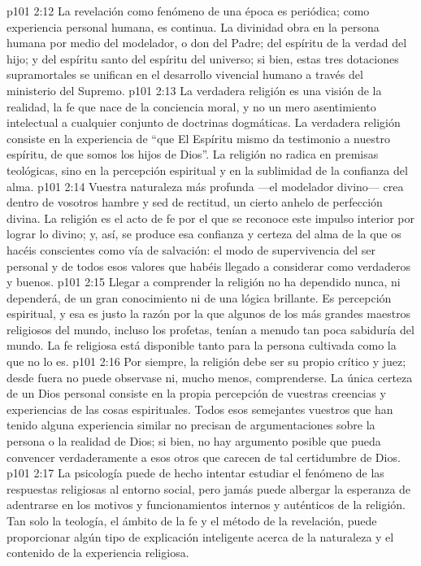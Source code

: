\vs p101 2:12 \pc La revelación como fenómeno de una época es periódica; como experiencia personal humana, es continua. La divinidad obra en la persona humana por medio del modelador, o don del Padre; del espíritu de la verdad del hijo; y del espíritu santo del espíritu del universo; si bien, estas tres dotaciones supramortales se unifican en el desarrollo vivencial humano a través del ministerio del Supremo.
\vs p101 2:13 La verdadera religión es una visión de la realidad, la fe que nace de la conciencia moral, y no un mero asentimiento intelectual a cualquier conjunto de doctrinas dogmáticas. La verdadera religión consiste en la experiencia de “que El Espíritu mismo da testimonio a nuestro espíritu, de que somos los hijos de Dios”. La religión no radica en premisas teológicas, sino en la percepción espiritual y en la sublimidad de la confianza del alma.
\vs p101 2:14 Vuestra naturaleza más profunda ---el modelador divino--- crea dentro de vosotros hambre y sed de rectitud, un cierto anhelo de perfección divina. La religión es el acto de fe por el que se reconoce este impulso interior por lograr lo divino; y, así, se produce esa confianza y certeza del alma de la que os hacéis conscientes como vía de salvación: el modo de supervivencia del ser personal y de todos esos valores que habéis llegado a considerar como verdaderos y buenos.
\vs p101 2:15 \pc Llegar a comprender la religión no ha dependido nunca, ni dependerá, de un gran conocimiento ni de una lógica brillante. Es percepción espiritual, y esa es justo la razón por la que algunos de los más grandes maestros religiosos del mundo, incluso los profetas, tenían a menudo tan poca sabiduría del mundo. La fe religiosa está disponible tanto para la persona cultivada como la que no lo es.
\vs p101 2:16 Por siempre, la religión debe ser su propio crítico y juez; desde fuera no puede observase ni, mucho menos, comprenderse. La única certeza de un Dios personal consiste en la propia percepción de vuestras creencias y experiencias de las cosas espirituales. Todos esos semejantes vuestros que han tenido alguna experiencia similar no precisan de argumentaciones sobre la persona o la realidad de Dios; si bien, no hay argumento posible que pueda convencer verdaderamente a esos otros que carecen de tal certidumbre de Dios.
\vs p101 2:17 La psicología puede de hecho intentar estudiar el fenómeno de las respuestas religiosas al entorno social, pero jamás puede albergar la esperanza de adentrarse en los motivos y funcionamientos internos y auténticos de la religión. Tan solo la teología, el ámbito de la fe y el método de la revelación, puede proporcionar algún tipo de explicación inteligente acerca de la naturaleza y el contenido de la experiencia religiosa.
